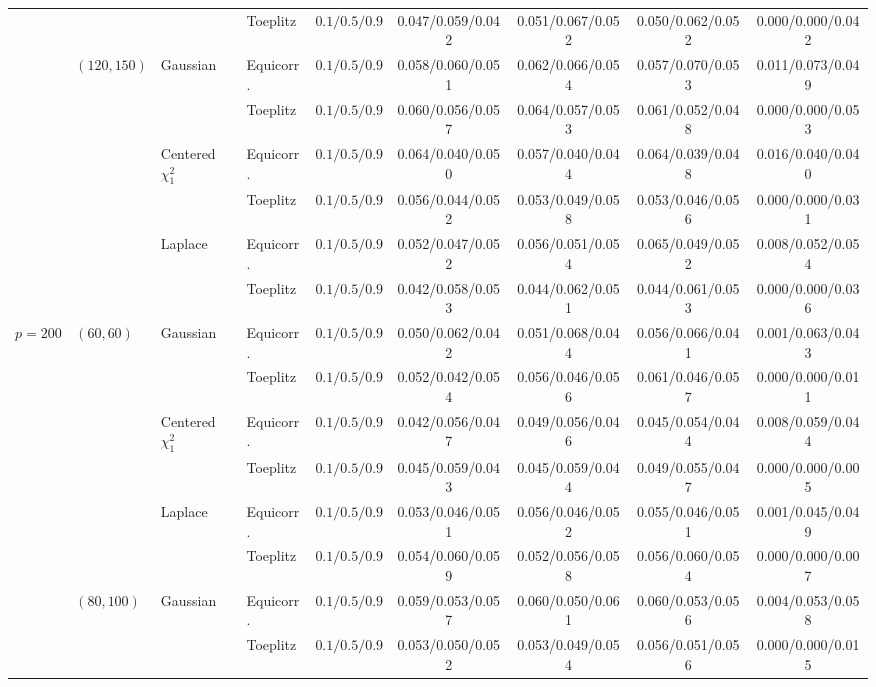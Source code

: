 \begin{landscape}
\begin{longtable}{@{}lllllcccc@{}}
\cmidrule(lr){4-9}
 &  &  & Toeplitz & $0.1/0.5/0.9$ & 0.047/0.059/0.042 & 0.051/0.067/0.052 & 0.050/0.062/0.052 & 0.000/0.000/0.042 \\
\addlinespace[2pt]
 & $(120,150)$ & Gaussian & Equicorr. & $0.1/0.5/0.9$ & 0.058/0.060/0.051 & 0.062/0.066/0.054 & 0.057/0.070/0.053 & 0.011/0.073/0.049 \\
\cmidrule(lr){4-9}
 &  &  & Toeplitz & $0.1/0.5/0.9$ & 0.060/0.056/0.057 & 0.064/0.057/0.053 & 0.061/0.052/0.048 & 0.000/0.000/0.053 \\
\cmidrule(lr){3-9}
 &  & Centered $\chi^2_1$ & Equicorr. & $0.1/0.5/0.9$ & 0.064/0.040/0.050 & 0.057/0.040/0.044 & 0.064/0.039/0.048 & 0.016/0.040/0.040 \\
\cmidrule(lr){4-9}
 &  &  & Toeplitz & $0.1/0.5/0.9$ & 0.056/0.044/0.052 & 0.053/0.049/0.058 & 0.053/0.046/0.056 & 0.000/0.000/0.031 \\
\cmidrule(lr){3-9}
 &  & Laplace & Equicorr. & $0.1/0.5/0.9$ & 0.052/0.047/0.052 & 0.056/0.051/0.054 & 0.065/0.049/0.052 & 0.008/0.052/0.054 \\
\cmidrule(lr){4-9}
 &  &  & Toeplitz & $0.1/0.5/0.9$ & 0.042/0.058/0.053 & 0.044/0.062/0.051 & 0.044/0.061/0.053 & 0.000/0.000/0.036 \\
\midrule
$p=200$ & $(60,60)$ & Gaussian & Equicorr. & $0.1/0.5/0.9$ & 0.050/0.062/0.042 & 0.051/0.068/0.044 & 0.056/0.066/0.041 & 0.001/0.063/0.043 \\
\cmidrule(lr){4-9}
 &  &  & Toeplitz & $0.1/0.5/0.9$ & 0.052/0.042/0.054 & 0.056/0.046/0.056 & 0.061/0.046/0.057 & 0.000/0.000/0.011 \\
\cmidrule(lr){3-9}
 &  & Centered $\chi^2_1$ & Equicorr. & $0.1/0.5/0.9$ & 0.042/0.056/0.047 & 0.049/0.056/0.046 & 0.045/0.054/0.044 & 0.008/0.059/0.044 \\
\cmidrule(lr){4-9}
 &  &  & Toeplitz & $0.1/0.5/0.9$ & 0.045/0.059/0.043 & 0.045/0.059/0.044 & 0.049/0.055/0.047 & 0.000/0.000/0.005 \\
\cmidrule(lr){3-9}
 &  & Laplace & Equicorr. & $0.1/0.5/0.9$ & 0.053/0.046/0.051 & 0.056/0.046/0.052 & 0.055/0.046/0.051 & 0.001/0.045/0.049 \\
\cmidrule(lr){4-9}
 &  &  & Toeplitz & $0.1/0.5/0.9$ & 0.054/0.060/0.059 & 0.052/0.056/0.058 & 0.056/0.060/0.054 & 0.000/0.000/0.007 \\
\addlinespace[2pt]
 & $(80,100)$ & Gaussian & Equicorr. & $0.1/0.5/0.9$ & 0.059/0.053/0.057 & 0.060/0.050/0.061 & 0.060/0.053/0.056 & 0.004/0.053/0.058 \\
\cmidrule(lr){4-9}
 &  &  & Toeplitz & $0.1/0.5/0.9$ & 0.053/0.050/0.052 & 0.053/0.049/0.054 & 0.056/0.051/0.056 & 0.000/0.000/0.015 \\

\end{longtable}
\end{landscape}

